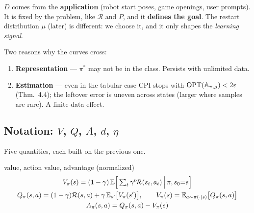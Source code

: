 \begin{keybox}
$D$ comes from the \textbf{application} (robot start poses, game openings, user prompts). It is fixed by the problem, like $\mathcal R$ and $P$, and it \textbf{defines the goal}. The restart distribution $\mu$ (later) is different: we choose it, and it only shapes the \emph{learning signal}.
\end{keybox}

Two reasons why the curves cross:
\begin{enumerate}
  \item \textbf{Representation} --- $\pi^*$ may not be in the class. Persists with unlimited data.
  \item \textbf{Estimation} --- even in the tabular case CPI stops with $\mathrm{OPT}(\mathbb{A}_{\pi,\mu})<2\varepsilon$ (Thm.~4.4); the leftover error is uneven across states (larger where samples are rare). A finite-data effect.
\end{enumerate}


\subsection{Notation: $V$, $Q$, $A$, $d$, $\eta$}

Five quantities, each built on the previous one.

\begin{defbox}{value, action value, advantage (normalized)}
\begin{gather*}
  V_\pi(s) = (1-\gamma)\,\mathbb{E}\Big[\textstyle\sum_{t} \gamma^t \mathcal{R}(s_t,a_t) \,\Big|\, \pi, s_0{=}s\Big] \\
  Q_\pi(s,a) = (1-\gamma)\mathcal{R}(s,a) + \gamma\,\mathbb{E}_{s'}\big[V_\pi(s')\big], \qquad V_\pi(s) = \mathbb{E}_{a\sim\pi(\cdot|s)}\big[Q_\pi(s,a)\big] \\
  A_\pi(s,a) = Q_\pi(s,a) - V_\pi(s)
\end{gather*}
\end{defbox}

